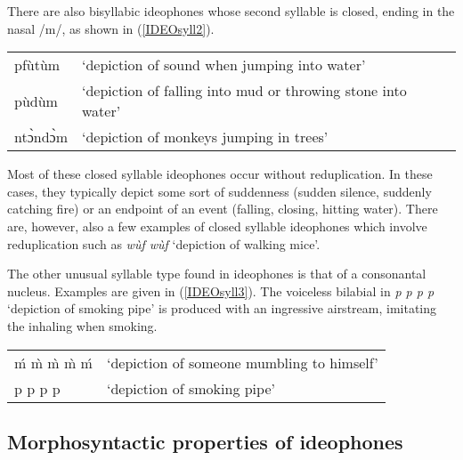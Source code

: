 \noindent There are also bisyllabic ideophones whose second syllable is closed, ending in the nasal /m/, as shown in (\ref{IDEOsyll2}).

\begin{exe} \ex \label{IDEOsyll2}
\begin{tabular}{ll}
pfùtùm & `depiction of sound when jumping into water' \\
pùdùm & `depiction of falling into mud or throwing stone into water'  \\
ntɔ̀ndɔ̀m & `depiction of monkeys jumping in trees' \\
\end{tabular}
\end{exe}


Most of these closed syllable ideophones occur without reduplication. In these cases, they typically depict some sort of suddenness  (sudden silence, suddenly catching fire) or an endpoint of an event (falling, closing, hitting water). There are, however, also a few examples of closed syllable ideophones which involve reduplication such as {\itshape wùf wùf} `depiction of walking mice'.

The other unusual syllable type found in ideophones is that of a consonantal nucleus. Examples are given in (\ref{IDEOsyll3}). The voiceless bilabial in {\itshape p p p p} `depiction of smoking pipe' is produced with an ingressive airstream, imitating the inhaling when smoking.


\begin{exe} \ex \label{IDEOsyll3}
\begin{tabular}{ll}
ḿ m̀ m̀ m̀ ḿ & `depiction of someone mumbling to himself' \\
p p p p & `depiction of smoking pipe'  \\
\end{tabular}
\end{exe}






\subsection{Morphosyntactic properties of ideophones}
\label{sec:IDEOsyn}

